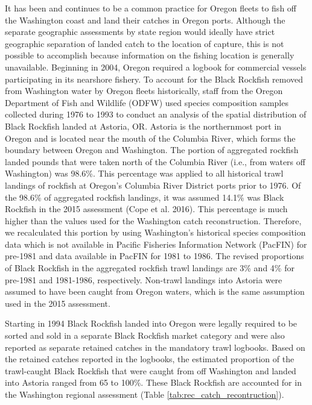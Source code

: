 \documentclass[11pt,
  english,
  letterpaper,
]{article}
\begin{document}
It has been and continues to be a common practice for Oregon fleets to fish off the Washington coast and land their catches in Oregon ports. Although the separate geographic assessments by state region would ideally have strict geographic separation of landed catch to the location of capture, this is not possible to accomplish because information on the fishing location is generally unavailable. Beginning in 2004, Oregon required a logbook for commercial vessels participating in its nearshore fishery. To account for the Black Rockfish removed from Washington water by Oregon fleets historically, staff from the Oregon Department of Fish and Wildlife (ODFW) used species composition samples collected during 1976 to 1993 to conduct an analysis of the spatial distribution of Black Rockfish landed at Astoria, OR. Astoria is the northernmost port in Oregon and is located near the mouth of the Columbia River, which forms the boundary between Oregon and Washington. The portion of aggregated rockfish landed pounds that were taken north of the Columbia River (i.e., from waters off Washington) was 98.6\%. This percentage was applied to all historical trawl landings of rockfish at Oregon's Columbia River District ports prior to 1976. Of the 98.6\% of aggregated rockfish landings, it was assumed 14.1\% was Black Rockfish in the 2015 assessment (Cope et al. 2016). This percentage is much higher than the values used for the Washington catch reconstruction. Therefore, we recalculated this portion by using Washington's historical species composition data which is not available in Pacific Fisheries Information Network (PacFIN) for pre-1981 and data available in PacFIN for 1981 to 1986. The revised proportions of Black Rockfish in the aggregated rockfish trawl landings are 3\% and 4\% for pre-1981 and 1981-1986, respectively. Non-trawl landings into Astoria were assumed to have been caught from Oregon waters, which is the same assumption used in the 2015 assessment.

Starting in 1994 Black Rockfish landed into Oregon were legally required to be sorted and sold in a separate Black Rockfish market category and were also reported as separate retained catches in the mandatory trawl logbooks. Based on the retained catches reported in the logbooks, the estimated proportion of the trawl-caught Black Rockfish that were caught from off Washington and landed into Astoria ranged from 65 to 100\%. These Black Rockfish are accounted for in the Washington regional assessment (Table \ref{tab:rec_catch_recontruction}).
\end{document}
